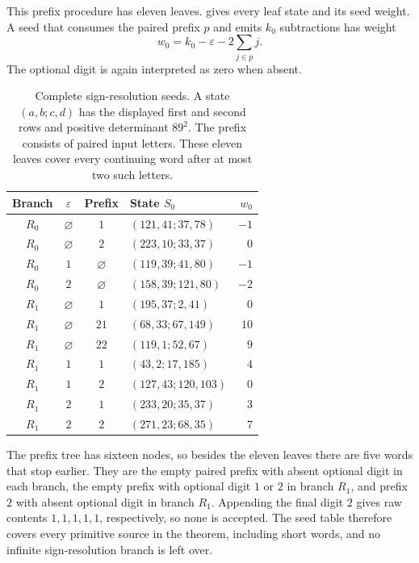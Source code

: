 This prefix procedure has eleven leaves.  gives every
leaf state and its seed weight. A seed that consumes the paired prefix
$p$ and emits $k_0$ subtractions has weight
\begin{equation}
 w_0=k_0-\varepsilon-2\sum_{j\in p}j.
 \label{eq:seed-weight}
\end{equation}
The optional digit is again interpreted as zero when absent.

\begin{table}[tb]
\centering
\caption{Complete sign-resolution seeds. A state $(a,b;c,d)$ has the
displayed first and second rows and positive determinant $89^2$.
The prefix consists of paired input letters. These eleven leaves cover
every continuing word after at most two such letters.}
\label{tab:seeds}
\begin{tabular}{ccclr}
\toprule
Branch & $\varepsilon$ & Prefix & State $S_0$ & $w_0$\\
\midrule
$R_0$ & $\varnothing$ & $1$ & $(121,41;37,78)$ & $-1$\\
$R_0$ & $\varnothing$ & $2$ & $(223,10;33,37)$ & $0$\\
$R_0$ & $1$ & $\varnothing$ & $(119,39;41,80)$ & $-1$\\
$R_0$ & $2$ & $\varnothing$ & $(158,39;121,80)$ & $-2$\\
$R_1$ & $\varnothing$ & $1$ & $(195,37;2,41)$ & $0$\\
$R_1$ & $\varnothing$ & $21$ & $(68,33;67,149)$ & $10$\\
$R_1$ & $\varnothing$ & $22$ & $(119,1;52,67)$ & $9$\\
$R_1$ & $1$ & $1$ & $(43,2;17,185)$ & $4$\\
$R_1$ & $1$ & $2$ & $(127,43;120,103)$ & $0$\\
$R_1$ & $2$ & $1$ & $(233,20;35,37)$ & $3$\\
$R_1$ & $2$ & $2$ & $(271,23;68,35)$ & $7$\\
\bottomrule
\end{tabular}
\end{table}

The prefix tree has sixteen nodes, so besides the eleven leaves there are
five words that stop earlier. They are the empty paired prefix with absent
optional digit in each branch, the empty prefix with optional digit $1$ or
$2$ in branch $R_1$, and prefix $2$ with absent optional digit in branch
$R_1$. Appending the final digit $2$ gives raw contents
$1,1,1,1,1$, respectively, so none is accepted. The seed table therefore
covers every primitive source in the theorem, including short words, and
no infinite sign-resolution branch is left over.

